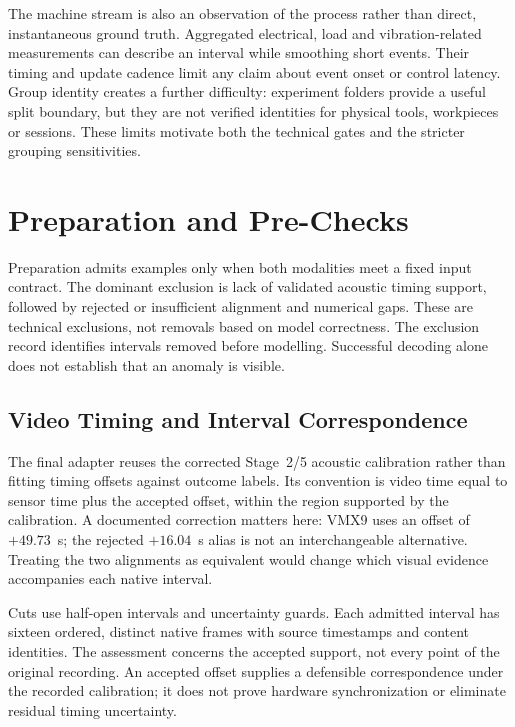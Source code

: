 The machine stream is also an observation of the process rather than direct,
instantaneous ground truth. Aggregated electrical, load and vibration-related
measurements can describe an interval while smoothing short events. Their timing and
update cadence limit any claim about event onset or control latency. Group identity
creates a further difficulty: experiment folders provide a useful split boundary, but
they are not verified identities for physical tools, workpieces or sessions. These
limits motivate both the technical gates and the stricter grouping sensitivities.

\section{Preparation and Pre-Checks}
Preparation admits examples only when both modalities meet a fixed input contract. The
dominant exclusion is lack of validated acoustic timing support, followed by rejected or
insufficient alignment and numerical gaps. These are technical exclusions, not removals
based on model correctness. The exclusion record identifies intervals removed before
modelling. Successful decoding alone does not establish that an anomaly is visible.

\subsection{Video Timing and Interval Correspondence}
The final adapter reuses the corrected Stage~2/5 acoustic calibration rather than
fitting timing offsets against outcome labels. Its convention is video time equal to
sensor time plus the accepted offset, within the region supported by the calibration. A
documented correction matters here: VMX9 uses an offset of $+49.73$~s; the rejected
$+16.04$~s alias is not an interchangeable alternative. Treating the two alignments as
equivalent would change which visual evidence accompanies each native interval.

Cuts use half-open intervals and uncertainty guards. Each admitted interval has sixteen
ordered, distinct native frames with source timestamps and content identities. The
assessment concerns the accepted support, not every point of the original recording. An
accepted offset supplies a defensible correspondence under the recorded calibration; it
does not prove hardware synchronization or eliminate residual timing uncertainty.

